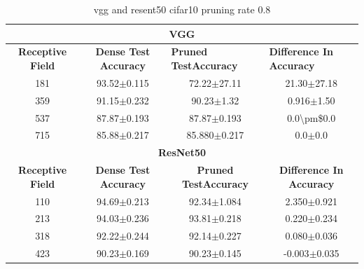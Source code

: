 \begin{table}[]
\begin{tabular}{@{}cccc@{}}
\toprule
\multicolumn{4}{c}{\textbf{VGG}}                                                                                                                                  \\ \midrule
\textbf{Receptive Field} & \textbf{Dense Test Accuracy} & \multicolumn{1}{l}{\textbf{Pruned  TestAccuracy}} & \multicolumn{1}{l}{\textbf{Difference In Accuracy}} \\ \midrule
181                      & 93.52$\pm$0.115              & 72.22$\pm$27.11                                   & 21.30$\pm$27.18                                     \\
359                      & 91.15$\pm$0.232              & 90.23$\pm$1.32                                    & 0.916$\pm$1.50                                      \\
537                      & 87.87$\pm$0.193              & 87.87$\pm$0.193                                   & 0.0\textbackslash{}pm\$0.0                          \\
715                      & 85.88$\pm$0.217              & 85.880$\pm$0.217                                  & 0.0$\pm$0.0                                         \\ \midrule
\multicolumn{4}{c}{\textbf{ResNet50}}                                                                                                                             \\ \midrule
\textbf{Receptive Field} & \textbf{Dense Test Accuracy} & \textbf{Pruned  TestAccuracy}                     & \textbf{Difference In Accuracy}                     \\
110                      & 94.69$\pm$0.213              & 92.34$\pm$1.084                                   & 2.350$\pm$0.921                                     \\
213                      & 94.03$\pm$0.236              & 93.81$\pm$0.218                                   & 0.220$\pm$0.234                                     \\
318                      & 92.22$\pm$0.244              & 92.14$\pm$0.227                                   & 0.080$\pm$0.036                                     \\
423                      & 90.23$\pm$0.169              & 90.23$\pm$0.145                                   & -0.003$\pm$0.035                                    \\ \bottomrule
\end{tabular}



\caption{vgg and resent50 cifar10 pruning rate 0.8}
\label{tab:cifar10 pruning rate08}
\end{table}

